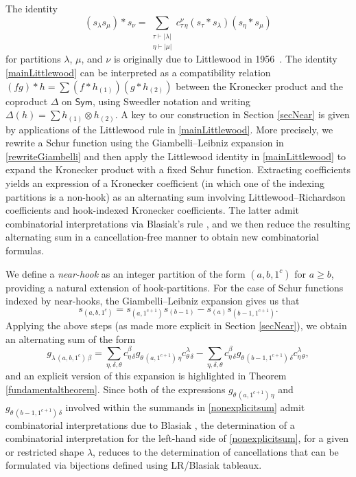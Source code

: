 \documentclass[12pt]{article}
\begin{document}
 The identity 
\begin{equation}\label{mainLittlewood}
 (s_{\lambda} s_{\mu}) \ast s_{\nu} = \sum_{ \substack{\tau \vdash |\lambda| \\ \eta \vdash |\mu|} } c_{\tau \, \eta}^{\nu} (s_{\tau} 
 \ast s_{\lambda}) (s_{\eta} \ast s_{\mu}) 
\end{equation}
 for partitions $\lambda$, $\mu$, and $\nu$ is originally due to Littlewood in 1956~\cite{Littlewood1956}. The identity 
 \eqref{mainLittlewood} can be interpreted as a compatibility relation $ (fg) \ast h = \sum (f \ast h_{(1)}) (g \ast h_{(2)})$ between the 
 Kronecker product and the coproduct $\Delta$ on $\textsf{Sym}$, using Sweedler notation and writing $\Delta(h) = \sum h_{(1)} 
 \otimes h_{(2)}$. A key to our construction in Section \ref{secNear} is given by applications of the Littlewood rule in 
 \eqref{mainLittlewood}. More precisely, we rewrite a Schur function using the Giambelli--Leibniz expansion in 
 \eqref{rewriteGiambelli} and then apply the Littlewood identity in \eqref{mainLittlewood} to expand the Kronecker product with a 
 fixed Schur function. Extracting coefficients yields an expression of a Kronecker coefficient (in which one of the indexing partitions 
 is a non-hook) as an alternating sum involving Littlewood--Richardson coefficients and hook-indexed Kronecker coefficients. The 
 latter admit combinatorial interpretations via Blasiak's rule \cite{Blasiak20162018}, and we then reduce the resulting alternating sum in a 
 cancellation-free manner to obtain new combinatorial formulas.

 We define a \emph{near-hook} as an integer partition of the form $(a, b, 1^c)$ for $a \geq b$, providing a natural extension of 
 hook-partitions. For the case of Schur functions indexed by near-hooks, the Giambelli--Leibniz expansion gives us that 
\begin{equation}\label{GLgives}
 s_{(a, b, 1^c)} = s_{(a, 1^{c+1})} s_{(b-1)} - s_{(a)} s_{(b-1, 1^{c+1})}. 
\end{equation}
 Applying the above steps (as made more explicit in Section \ref{secNear}), we obtain an alternating sum of the form 
\begin{equation}\label{nonexplicitsum}
 g_{\lambda \, (a, b, 1^{c}) \, \beta} = \sum_{ \eta, \delta, \theta } 
 c_{\eta \, \delta}^{\beta} g_{\theta \, (a, 1^{c+1}) \, \eta } c^{\lambda}_{\theta \, \delta} 
 - \sum_{ \eta, \delta, \theta } 
 c_{\eta \, \delta}^{\beta} g_{\theta \, (b-1, 1^{c+1}) \, \delta } c^{\lambda}_{\eta \, \theta}, 
\end{equation}
 and an explicit version of this expansion is highlighted in Theorem \ref{fundamentaltheorem}. Since both of the expressions 
 $g_{\theta \, (a, 1^{c+1}) \, \eta } $ and $g_{\theta \, (b-1, 1^{c+1}) \, \delta }$ involved within the summands in \eqref{nonexplicitsum} 
 admit combinatorial interpretations due to Blasiak \cite{Blasiak20162018}, the determination of a combinatorial interpretation for the 
 left-hand side of \eqref{nonexplicitsum}, for a given or restricted shape $\lambda$, reduces to the determination of cancellations 
 that can be formulated via bijections defined using
 LR/Blasiak tableaux. 
\end{document}
